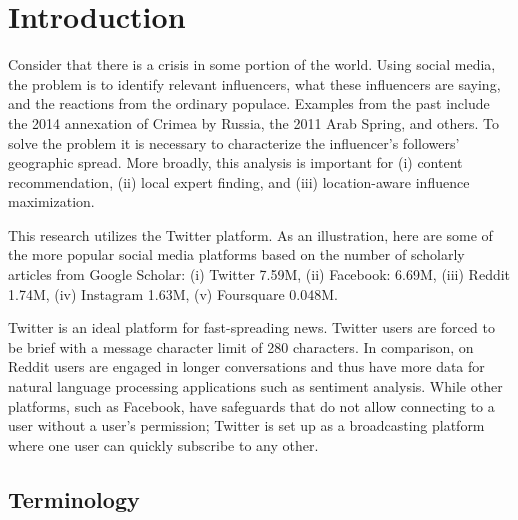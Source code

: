 \chapter{Introduction}\label{chap:Intro}

Consider that there is a crisis in some portion of the world. Using social media, the problem is to identify relevant influencers, what these influencers are saying, and the reactions from the ordinary populace. Examples from the past include the 2014 annexation of Crimea by Russia, the 2011 Arab Spring, and others. To solve the problem it is necessary to characterize the influencer's followers' geographic spread. More broadly, this analysis is important for (i) content recommendation, (ii) local expert finding, and (iii) location-aware influence maximization.

This research utilizes the Twitter platform. As an illustration, here are some of the more popular social media platforms based on the number of scholarly articles from Google Scholar: (i) Twitter 7.59M, (ii) Facebook: 6.69M, (iii) Reddit 1.74M, (iv) Instagram 1.63M, (v) Foursquare 0.048M.

Twitter is an ideal platform for fast-spreading news. Twitter users are forced to be brief with a message character limit of 280 characters. In comparison, on Reddit users are engaged in longer conversations and thus have more data for natural language processing applications such as sentiment analysis. While other platforms, such as Facebook, have safeguards that do not allow connecting to a user without a user’s permission; Twitter is set up as a broadcasting platform where one user can quickly subscribe to any other.

\section{Terminology}

